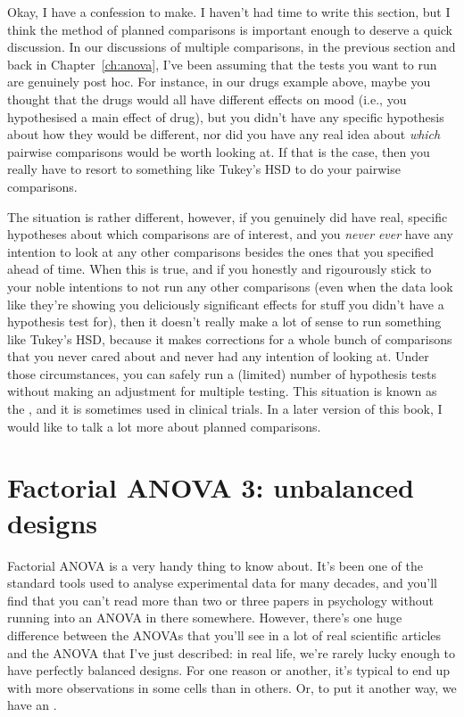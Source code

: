 Okay, I have a confession to make. I haven't had time to write this section, but I think the method of planned comparisons is important enough to deserve a quick discussion. In our discussions of multiple comparisons, in the previous section and back in Chapter~\ref{ch:anova}, I've been assuming that the tests you want to run are genuinely post hoc. For instance, in our drugs example above, maybe you thought that the drugs would all have different effects on mood (i.e., you hypothesised a main effect of drug), but you didn't have any specific hypothesis about how they would be different, nor did you have any real idea about {\it which} pairwise comparisons would be worth looking at. If that is the case, then you really have to resort to something like Tukey's HSD to do your pairwise comparisons.

The situation is rather different, however, if you genuinely did have real, specific hypotheses about which comparisons are of interest, and you {\it never} {\it ever} have any intention to look at any other comparisons besides the ones that you specified ahead of time. When this is true, and if you honestly and rigourously stick to your noble intentions to not run any other comparisons (even when the data look like they're showing you deliciously significant effects for stuff you didn't have a hypothesis test for), then it doesn't really make a lot of sense to run something like Tukey's HSD, because it makes corrections for a whole bunch of comparisons that you never cared about and never had any intention of looking at. Under those circumstances, you can safely run a (limited) number of hypothesis tests without making an adjustment for multiple testing. This situation is known as the , and it is sometimes used in clinical trials. In a later version of this book, I would like to talk a lot more about planned comparisons.


\section{Factorial ANOVA 3: unbalanced designs\label{sec:unbalancedanova}}

Factorial ANOVA is a very handy thing to know about. It's been one of the standard tools used to analyse experimental data for many decades, and you'll find that you can't read more than two or three papers in psychology without running into an ANOVA in there somewhere. However, there's one huge difference between the ANOVAs that you'll see in a lot of real scientific articles and the ANOVA that I've just described: in real life, we're rarely lucky enough to have perfectly balanced designs. For one reason or another, it's typical to end up with more observations in some cells than in others. Or, to put it another way, we have an .

